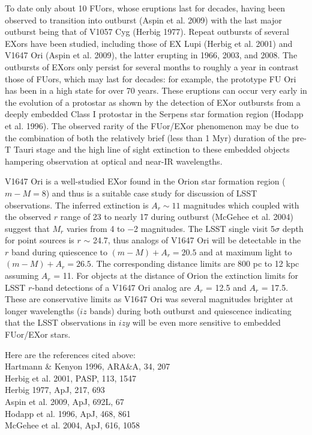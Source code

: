 To date only about 10 FUors, whose eruptions last for decades, having been observed to transition
into outburst (Aspin et al. 2009) with the last major outburst being that of V1057 Cyg (Herbig
1977). Repeat outbursts of several EXors have been studied, including those of EX Lupi (Herbig
et al. 2001) and V1647 Ori (Aspin et al. 2009), the latter erupting in 1966, 2003, and 2008. The
outbursts of EXors only persist for several months to roughly a year in contrast those of FUors,
which may last for decades: for example, the prototype FU Ori has been in a high state for over
70 years. These eruptions can occur very early in the evolution of a protostar as shown by the
detection of EXor outbursts from a deeply embedded Class I protostar in the Serpens star formation
region (Hodapp et al. 1996). The observed rarity of the FUor/EXor phenomenon may be due to
the combination of both the relatively brief (less than 1 Myr) duration of the pre-T Tauri stage
and the high line of sight extinction to these embedded objects hampering observation at optical
and near-IR wavelengths.

V1647 Ori is a well-studied EXor found in the Orion star formation region ($m−M = 8$) and
thus is a suitable case study for discussion of LSST observations. 
The
inferred extinction is $A_r \sim 11$ magnitudes which coupled with the observed $r$ range of 23 to nearly
17 during outburst (McGehee et al. 2004) suggest that $M_r$ varies from 4 to −2 magnitudes.
The LSST single visit 5$\sigma$ depth for point sources is $r$ $\sim$ 24.7, thus analogs of V1647 Ori will
be detectable in the $r$ band during quiescence to $(m−M) + A_r = 20.5$ and at maximum light
to $(m − M) + A_r = 26.5$. The corresponding distance limits are 800 pc to 12 kpc assuming
$A_r$ = 11. For objects at the distance of Orion the extinction limits for LSST $r$-band detections of
a V1647 Ori analog are $A_r$ = 12.5 and $A_r$ = 17.5. These are conservative limits as V1647 Ori was
several magnitudes brighter at longer wavelengths ($iz$ bands) during both outburst and quiescence
indicating that the LSST observations in $izy$ will be even more sensitive to embedded FUor/EXor
stars.

Here are the references cited above:\\
Hartmann \& Kenyon 1996, ARA\&A, 34, 207 \\
Herbig et al. 2001, PASP, 113, 1547 \\
Herbig 1977, ApJ, 217, 693 \\
Aspin et al. 2009, ApJ, 692L, 67 \\
Hodapp et al. 1996, ApJ, 468, 861 \\
McGehee et al. 2004, ApJ, 616, 1058 \\


